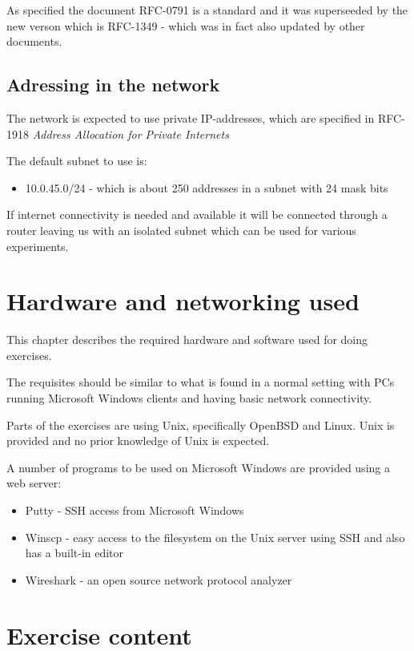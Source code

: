 \documentclass[a4paper,11pt,notitlepage]{report}
\begin{document}
As specified the document RFC-0791 is a standard and it was superseeded
by the new verson which is RFC-1349 - which was in fact also updated by
other documents.


\section*{\color{titlecolor}Adressing in the network}

The network is expected to use private IP-addresses, which are specified in
RFC-1918 \emph{Address Allocation for Private Internets}

The default subnet to use is:
\begin{itemize}
\item 10.0.45.0/24 - which is about 250 addresses in a subnet with 24 mask bits
\end{itemize}

If internet connectivity is needed and available it will be connected through
a router leaving us with an isolated subnet which can be used for various experiments.


\chapter*{\color{titlecolor}Hardware and networking used}

This chapter describes the required hardware and software
used for doing exercises.

The requisites should be similar to what is found in a normal setting with
PCs running Microsoft Windows clients and having basic network connectivity.

Parts of the exercises are using Unix, specifically OpenBSD and Linux. Unix
is provided and no prior knowledge of Unix is expected.

A number of programs to be used on Microsoft Windows are provided using
a web server:
\begin{itemize}
\item Putty - SSH access from Microsoft Windows
\item Winscp - easy access to the filesystem on the Unix server using SSH
and also has a built-in editor
\item Wireshark - an open source network protocol analyzer
\end{itemize}


\chapter*{\color{titlecolor}Exercise content}
\end{document}
